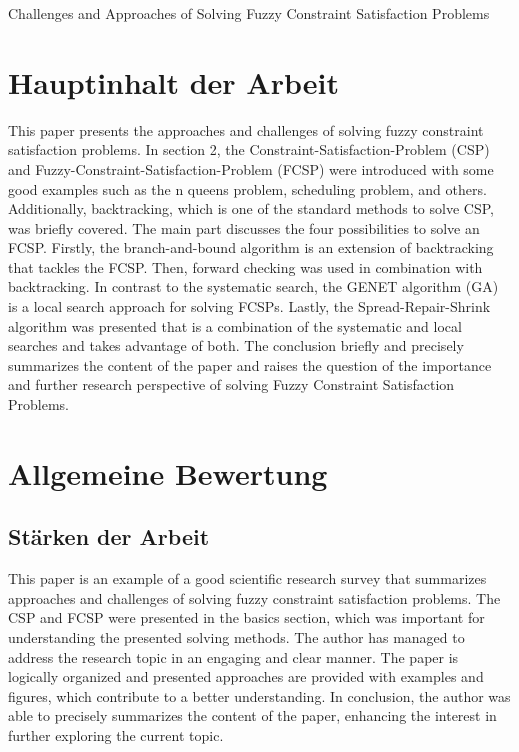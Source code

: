 \documentclass[a4paper,DIV=16]{scrartcl}
\begin{document}
Challenges and Approaches of Solving Fuzzy Constraint Satisfaction Problems


\section*{Hauptinhalt der Arbeit}

This paper presents the approaches and challenges of solving fuzzy constraint satisfaction problems. In section 2, the Constraint-Satisfaction-Problem (CSP) and Fuzzy-Constraint-Satisfaction-Problem (FCSP) were introduced with some good examples such as the n queens problem, scheduling problem, and others. Additionally, backtracking, which is one of the standard methods to solve CSP, was briefly covered. The main part discusses the four possibilities to solve an FCSP. Firstly, the branch-and-bound algorithm is an extension of backtracking that tackles the FCSP. Then, forward checking was used in combination with backtracking. In contrast to the systematic search, the GENET algorithm (GA) is a local search approach for solving FCSPs. Lastly, the Spread-Repair-Shrink algorithm was presented that is a combination of the systematic and local searches and takes advantage of both. The conclusion briefly and precisely summarizes the content of the paper and raises the question of the importance and further research perspective of solving Fuzzy Constraint Satisfaction Problems.


\section*{Allgemeine Bewertung}

\subsection*{Stärken der Arbeit}

This paper is an example of a good scientific research survey that summarizes approaches and challenges of solving fuzzy constraint satisfaction problems. The CSP and FCSP were presented in the basics section, which was important for understanding the presented solving methods. The author has managed to address the research topic in an engaging and clear manner. The paper is logically organized and presented approaches are provided with examples and figures, which contribute to a better understanding. In conclusion, the author was able to precisely summarizes the content of the paper, enhancing the interest in further exploring the current topic.
\end{document}
